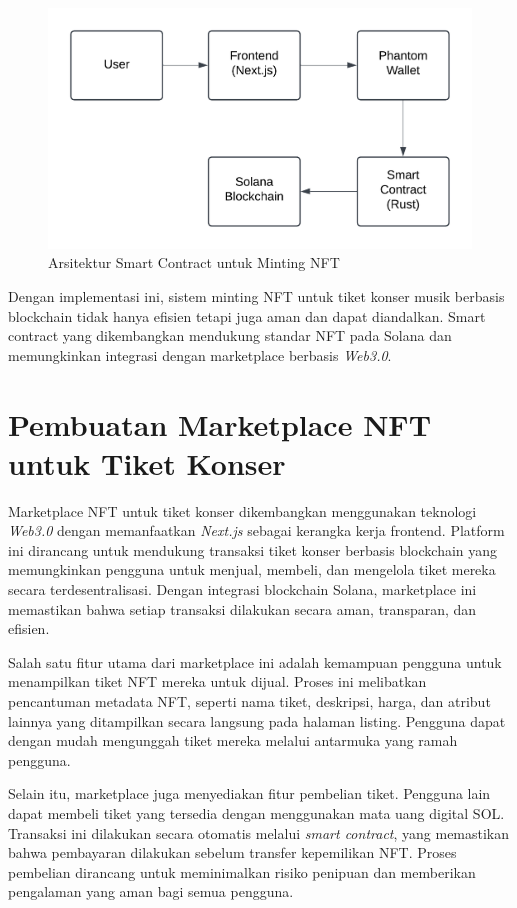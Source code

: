 \begin{figure}[H]
    \centering
    \includegraphics[scale=1]{gambar/3.2.6.png}
    \caption{Arsitektur Smart Contract untuk Minting NFT}
    \label{fig:smart-contract-architecture}
\end{figure}

Dengan implementasi ini, sistem minting NFT untuk tiket konser musik berbasis blockchain tidak hanya efisien tetapi juga aman dan dapat diandalkan. Smart contract yang dikembangkan mendukung standar NFT pada Solana dan memungkinkan integrasi dengan marketplace berbasis \textit{Web3.0}.


\section{Pembuatan Marketplace NFT untuk Tiket Konser}

Marketplace NFT untuk tiket konser dikembangkan menggunakan teknologi \textit{Web3.0} dengan memanfaatkan \textit{Next.js} sebagai kerangka kerja frontend. Platform ini dirancang untuk mendukung transaksi tiket konser berbasis blockchain yang memungkinkan pengguna untuk menjual, membeli, dan mengelola tiket mereka secara terdesentralisasi. Dengan integrasi blockchain Solana, marketplace ini memastikan bahwa setiap transaksi dilakukan secara aman, transparan, dan efisien.

Salah satu fitur utama dari marketplace ini adalah kemampuan pengguna untuk menampilkan tiket NFT mereka untuk dijual. Proses ini melibatkan pencantuman metadata NFT, seperti nama tiket, deskripsi, harga, dan atribut lainnya yang ditampilkan secara langsung pada halaman listing. Pengguna dapat dengan mudah mengunggah tiket mereka melalui antarmuka yang ramah pengguna.

Selain itu, marketplace juga menyediakan fitur pembelian tiket. Pengguna lain dapat membeli tiket yang tersedia dengan menggunakan mata uang digital SOL. Transaksi ini dilakukan secara otomatis melalui \textit{smart contract}, yang memastikan bahwa pembayaran dilakukan sebelum transfer kepemilikan NFT. Proses pembelian dirancang untuk meminimalkan risiko penipuan dan memberikan pengalaman yang aman bagi semua pengguna.

